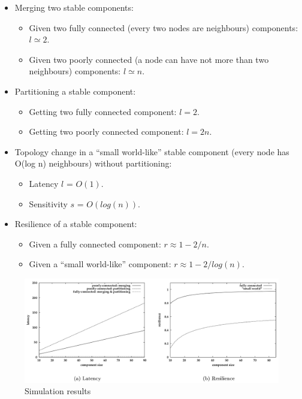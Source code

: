 \documentclass{article}
\begin{document}
\begin{itemize}
\item Merging two stable components:

\begin{itemize}
\item Given two fully connected (every two nodes are neighbours) components: $l \simeq 2$.
\item Given two poorly connected (a node can have not more than two neighbours) components: $l \simeq n$.
\end{itemize}

\item Partitioning a stable component:

\begin{itemize}
\item Getting two fully connected component: $l = 2$.
\item Getting two poorly connected component: $l = 2n$.
\end{itemize}

\item Topology change in a “small world-like” stable component (every node has O(log n) neighbours) without partitioning:
\begin{itemize}
\item Latency $l$ = $O(1)$.
\item Sensitivity $s$ = $O(log(n))$.
\end{itemize}

\item Resilience of a stable component:

\begin{itemize}
\item Given a fully connected component: $r \approx 1 - 2/n$.
\item Given a “small world-like” component: $r \approx 1 - 2/log(n)$.
\end{itemize}

\end{itemize}
\clearpage

\begin{figure}[hbtp]
\centering
\includegraphics[scale=.4]{performance_test.png}
\caption{Simulation results}
\end{figure}
\end{document}
